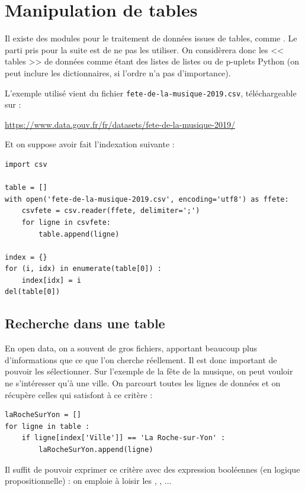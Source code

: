 {\chapter{Manipulation de tables}

Il existe des modules pour le traitement de données issues de tables, comme . Le parti pris pour la suite est de ne pas les utiliser. On considèrera donc les << tables >> de données comme étant des listes de listes ou de p-uplets Python  (on peut inclure les dictionnaires, si l'ordre n'a pas d'importance). 

L'exemple utilisé vient du fichier \texttt{fete-de-la-musique-2019.csv}, téléchargeable sur :

\href{https://www.data.gouv.fr/fr/datasets/r/49234ba7-00cd-401a-bb7c-70b81806b3eb}{https://www.data.gouv.fr/fr/datasets/fete-de-la-musique-2019/}

Et on suppose avoir fait l'indexation suivante :

\vspace{-2ex}
\begin{verbatim}
import csv

table = []
with open('fete-de-la-musique-2019.csv', encoding='utf8') as ffete:
    csvfete = csv.reader(ffete, delimiter=';')
    for ligne in csvfete:
        table.append(ligne)

index = {}
for (i, idx) in enumerate(table[0]) :
    index[idx] = i
del(table[0])
\end{verbatim}

\section{Recherche dans une table}



En open data, on a souvent de gros fichiers, apportant beaucoup plus d'informations que ce que l'on cherche réellement. Il est donc important de pouvoir les sélectionner. Sur l'exemple de la fête de la musique, on peut vouloir ne s'intéresser qu'à une ville. On parcourt toutes les lignes de données et on récupère celles qui satisfont à ce critère : 

\begin{verbatim}
laRocheSurYon = []
for ligne in table :
    if ligne[index['Ville']] == 'La Roche-sur-Yon' :
        laRocheSurYon.append(ligne)
\end{verbatim}

Il suffit de pouvoir exprimer ce critère avec des expression booléennes (en logique propositionnelle) : on emploie à loisir les ,  ,  ...

}
